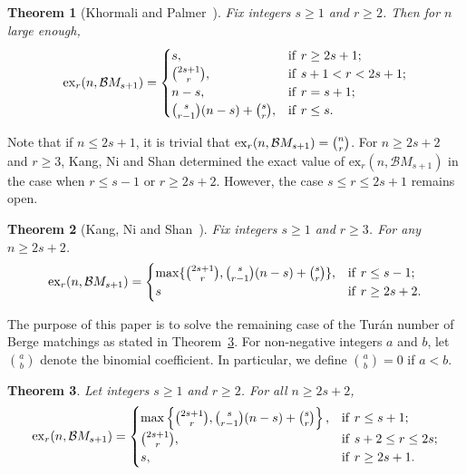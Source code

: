 \documentclass[11pt]{article}
\numberwithin{equation}{section}
\newtheorem{thm}{Theorem}[section]
\newcounter{cases}
\newcommand\ex{\ensuremath{\mathrm{ex}}}
\begin{document}
\begin{thm}[Khormali and Palmer~\cite{KHORMALI2022103506}]\label{thm: Khormali Palmer}
Fix integers $s \geq 1$ and $r \geq 2$. Then for $n$ large enough,
\begin{eqnarray*}
{\rm{ex}}_r(n,\mathcal{B}M_{s+1})=
\begin{cases}
s , & {\rm{if}}\ r \geq 2s + 1; \\
\binom{2s+1}{r}, & {\rm{if}}\ s+1 < r < 2s + 1; \\
n - s , & {\rm{if}}\ r = s+1; \\
\binom{s}{r-1} (n - s ) + \binom{s}{r}, & {\rm{if}}\ r \leq s.
\end{cases}
\end{eqnarray*}
\end{thm}

Note that if $n \le 2s+1$, it is trivial that ${\rm{ex}}_r(n,\mathcal{B}M_{s+1}) = \binom{n}{r}$. For $n\ge 2s+2$ and $r\geq3$, Kang, Ni and Shan \cite{KANG2022112901} determined the exact value of $\ex_r(n,\mathcal{B}M_{s+1})$ in the case when $r\leq s-1$ or $r\geq 2s+2$. However, the case $s\leq r\leq 2s+1$ remains open.

\begin{thm}[Kang, Ni and Shan~\cite{KANG2022112901}]\label{thm: Kang Ni Shan}
    Fix integers $s \ge 1$ and $r \ge 3$. For any $n \ge 2s+2$.
    \begin{eqnarray*}
    {\rm{ex}}_r(n,\mathcal{B}M_{s+1})=
    \begin{cases}
    \max\{ \binom{2s+1}{r}, \binom{s}{r-1} (n - s ) + \binom{s}{r}\}, & {\rm{if}}\ r \leq s - 1; \\
    s & {\rm{if}}\ r \ge 2s+2.
    \end{cases}
    \end{eqnarray*}
\end{thm}

The purpose of this paper is to solve the remaining case of the Tur\'{a}n number of Berge matchings as stated in Theorem~\ref{thm: exact berge}. 
For non-negative integers $a$ and $b$, let $\binom{a}{b}$ denote the binomial coefficient. In particular, we define $\binom{a}{b}=0$ if $a<b$. %

\begin{thm}\label{thm: exact berge}
    Let integers $s \ge 1$ and $r \ge 2$. For all $n \ge 2s+2$,
    \begin{eqnarray*}
    {\rm{ex}}_r(n,\mathcal{B}M_{s+1})=
    \begin{cases}
    \max\left\{ \binom{2s+1}{r}, \binom{s}{r-1} (n - s ) + \binom{s}{r}\right\}, & {\rm{if}}\ r \leq s + 1; \\
    \binom{2s+1}{r} , & {\rm{if}}\ s + 2 \leq r \leq 2s; \\
    s, & {\rm{if}}\ r \ge 2s+1.
    \end{cases}
    \end{eqnarray*}
\end{thm}
\end{document}
